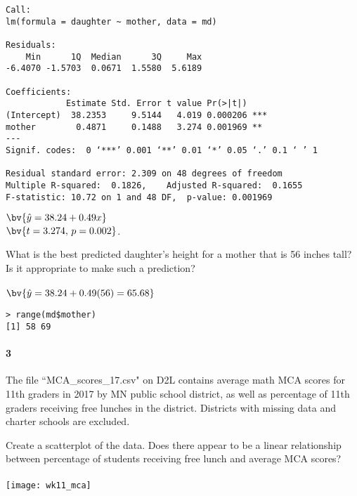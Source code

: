\documentclass{article}
\begin{document}
\begin{flushleft}
\begin{enumalpha}
\begin{verbatim}
Call:
lm(formula = daughter ~ mother, data = md)

Residuals:
    Min      1Q  Median      3Q     Max 
-6.4070 -1.5703  0.0671  1.5580  5.6189 

Coefficients:
            Estimate Std. Error t value Pr(>|t|)    
(Intercept)  38.2353     9.5144   4.019 0.000206 ***
mother        0.4871     0.1488   3.274 0.001969 ** 
---
Signif. codes:  0 ‘***’ 0.001 ‘**’ 0.01 ‘*’ 0.05 ‘.’ 0.1 ‘ ’ 1

Residual standard error: 2.309 on 48 degrees of freedom
Multiple R-squared:  0.1826,	Adjusted R-squared:  0.1655 
F-statistic: 10.72 on 1 and 48 DF,  p-value: 0.001969
\end{verbatim}

$\bv{\hat y = 38.24 + 0.49 x}$\\
$\bv{t = 3.274, \, p = 0.002}$. 
\vspace{.5in}

\item What is the best predicted daughter's height for a mother that is 56 inches tall? Is it appropriate to make such a prediction?\\
\medskip
{}\\
$\bv{\hat y = 38.24 + 0.49 (56) = 65.68}$\\
\medskip
\begin{verbatim}
> range(md$mother)
[1] 58 69
\end{verbatim}


\end{enumalpha}



\newpage
\paragraph{3} The file ``MCA\_scores\_17.csv" on D2L contains average math MCA scores for 11th graders in 2017 by MN public school district, as well as percentage of 11th graders receiving free lunches in the district. Districts with missing data and charter schools are excluded.
\begin{enumalpha}
\item Create a scatterplot of the data. Does there appear to be a linear relationship between percentage of students receiving free lunch and average MCA scores?\\
\medskip
{}\\
\medskip
\texttt{[image: wk11\_mca]}
\vspace{.25in}


\end{enumalpha}
\end{flushleft}
\end{document}

